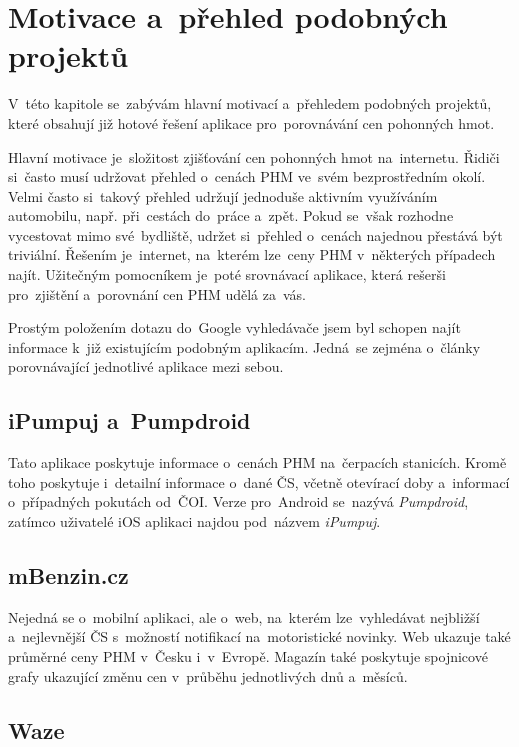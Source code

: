 \chapter{Motivace a~přehled podobných projektů}
\label{ch:motivation-and-similar-applications}

V~této kapitole se~zabývám hlavní motivací a~přehledem podobných projektů,
které obsahují již hotové řešení aplikace pro~porovnávání cen pohonných hmot.

Hlavní motivace je~složitost zjišťování cen pohonných hmot na~internetu.
Řidiči si~často musí udržovat přehled o~cenách PHM ve~svém bezprostředním
okolí. Velmi často si~takový přehled udržují jednoduše aktivním využíváním
automobilu, např. při~cestách do~práce a~zpět. Pokud se~však rozhodne
vycestovat mimo své~bydliště, udržet si~přehled o~cenách najednou přestává
být triviální. Řešením je~internet, na~kterém lze~ceny PHM v~některých
případech najít. Užitečným pomocníkem je~poté srovnávací aplikace, která
rešerši pro~zjištění a~porovnání cen PHM udělá za~vás.

Prostým položením dotazu do~Google vyhledávače jsem byl schopen najít
informace k~již existujícím podobným aplikacím. Jedná~se zejména o~články
porovnávající jednotlivé aplikace mezi sebou.

\section{iPumpuj a~Pumpdroid}
\label{sec:ipumpuj-pumpdroid}

Tato aplikace poskytuje informace o~cenách PHM na~čerpacích stanicích.
Kromě toho poskytuje i~detailní informace o~dané ČS, včetně otevírací
doby a~informací o~případných pokutách od~ČOI. Verze pro~Android
se~nazývá \emph{Pumpdroid}, zatímco uživatelé iOS aplikaci najdou
pod~názvem \emph{iPumpuj}.
\cite{Vrablova2022, Sarikova2021}

\section{mBenzin.cz}
\label{sec:mbenzin}

Nejedná se o~mobilní aplikaci, ale o~web, na~kterém lze~vyhledávat
nejbližší a~nejlevnější ČS s~možností notifikací na~motoristické
novinky. Web ukazuje také průměrné ceny PHM v~Česku i~v~Evropě.
Magazín také poskytuje spojnicové grafy ukazující změnu cen
v~průběhu jednotlivých dnů a~měsíců.
\cite{Vrablova2022}

\section{Waze}
\label{sec:waze}

